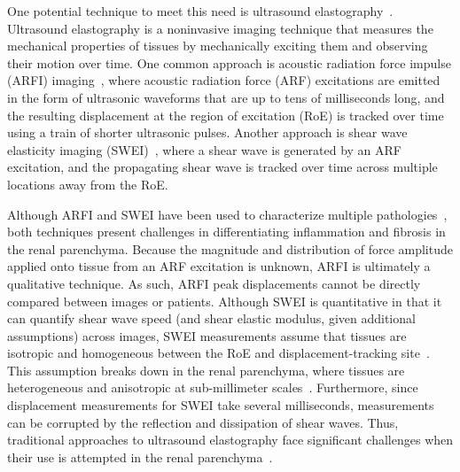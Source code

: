 One potential technique to meet this need is ultrasound elastography~\cite{urban_Novel_2021}. Ultrasound elastography is a noninvasive imaging technique that measures the mechanical properties of tissues by mechanically exciting them and observing their motion over time. One common approach is acoustic radiation force impulse (ARFI) imaging~\cite{nightingale_feasibility_2001,nightingale_Acoustic_2002}, where acoustic radiation force (ARF) excitations are emitted in the form of ultrasonic waveforms that are up to tens of milliseconds long, and the resulting displacement at the region of excitation (RoE) is tracked over time using a train of shorter ultrasonic pulses. Another approach is shear wave elasticity imaging (SWEI)~\cite{sarvazyan_Shear_1998,nightingale_Shearwave_2003}, where a shear wave is generated by an ARF excitation, and the propagating shear wave is tracked over time across multiple locations away from the RoE.

Although ARFI and SWEI have been used to characterize multiple pathologies~\cite{tsai_Sonographic_2013, stock_ARFIbased_2011, magalhaes_Diagnostic_2017, frulio_Evaluation_2013, barr_Update_2020}, both techniques present challenges in differentiating inflammation and fibrosis in the renal parenchyma. Because the magnitude and distribution of force amplitude applied onto tissue from an ARF excitation is unknown, ARFI is ultimately a qualitative technique. As such, ARFI peak displacements cannot be directly compared between images or patients. Although SWEI is quantitative in that it can quantify shear wave speed (and shear elastic modulus, given additional assumptions) across images, SWEI measurements assume that tissues are isotropic and homogeneous between the RoE and displacement-tracking site~\cite{sarvazyan_Shear_1998}. This assumption breaks down in the renal parenchyma, where tissues are heterogeneous and anisotropic at sub-millimeter scales~\cite{urban_Novel_2021, liu_Effect_2017}. Furthermore, since displacement measurements for SWEI take several milliseconds, measurements can be corrupted by the reflection and dissipation of shear waves. Thus, traditional approaches to ultrasound elastography face significant challenges when their use is attempted in the renal parenchyma~\cite{orlacchio_Kidney_2014, urban_Novel_2021}.

